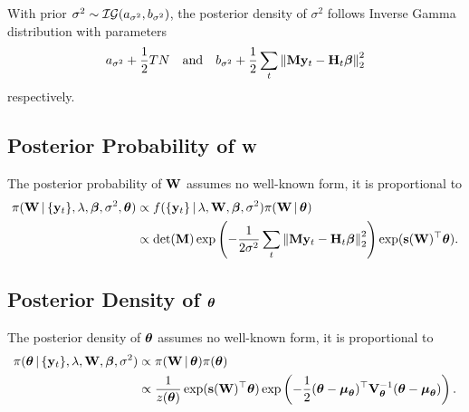 \documentclass[a4paper]{article}
\begin{document}
With prior $\sigma^{2}\sim\mathcal{IG}(a_{\sigma^2},b_{\sigma^2})$,
the posterior density of $\sigma^2$ follows Inverse Gamma distribution with
parameters
\begin{gather*}
	a_{\sigma^2}+\frac12 TN
	\quad\text{and}\quad
	b_{\sigma^{2}}
	+\frac12
	\sum_{t}
	\left\| \mathbf{M}\mathbf{y}_{t} - \mathbf{H}_{t}\boldsymbol{\beta} \right\|_{2}^{2}
\end{gather*}
respectively.

\subsection{Posterior Probability of \texorpdfstring{$\mathbf{W}$}{W}}\label{app:posterior-W}

The posterior probability of $\mathbf{W}$ assumes no well-known form,
it is proportional to
\begin{align*}
	\pi(\mathbf{W}\,|\,\{\mathbf{y}_{t}\},\lambda,\boldsymbol{\beta},\sigma^{2},\boldsymbol{\theta})
	&\propto f(\{\mathbf{y}_{t}\}\,|\,\lambda,\mathbf{W},\boldsymbol{\beta},\sigma^{2}) \pi(\mathbf{W}\,|\,\boldsymbol{\theta}) \\
	&\propto
	\det(\mathbf{M})
	\exp\left( -\frac1{2\sigma^2} \sum_{t} \left\|\mathbf{M}\mathbf{y}_{t}-\mathbf{H}_{t}\boldsymbol{\beta}\right\|_{2}^{2} \right)
	\exp(\mathbf{s}(\mathbf{W})^\top\boldsymbol{\theta}).
\end{align*}

\subsection{Posterior Density of \texorpdfstring{$\boldsymbol{\theta}$}{theta}}\label{app:posterior-W}

The posterior density of $\boldsymbol{\theta}$ assumes no well-known form,
it is proportional to
\begin{align*}
	\pi(\boldsymbol{\theta}\,|\,\{\mathbf{y}_{t}\},\lambda,\mathbf{W},\boldsymbol{\beta},\sigma^2)
	&\propto \pi(\mathbf{W}\,|\,\boldsymbol{\theta})\pi(\boldsymbol{\theta}) \\
	&\propto
	\frac1{z(\boldsymbol{\theta})}
	\exp(\mathbf{s}(\mathbf{W})^\top\boldsymbol{\theta})
	\exp\left(-\frac12(\boldsymbol{\theta}-\boldsymbol{\mu}_{\boldsymbol{\theta}})^\top\mathbf{V}_{\boldsymbol{\theta}}^{-1}(\boldsymbol{\theta}-\boldsymbol{\mu}_{\boldsymbol{\theta}})\right).
\end{align*}


\end{document}
